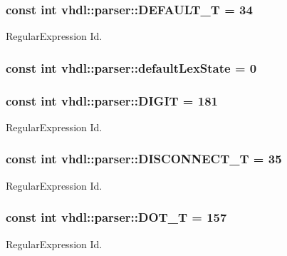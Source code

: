 \subsubsection[{D\+E\+F\+A\+U\+L\+T\+\_\+\+T}]{\setlength{\rightskip}{0pt plus 5cm}const int vhdl\+::parser\+::\+D\+E\+F\+A\+U\+L\+T\+\_\+\+T = 34}\label{namespacevhdl_1_1parser_aed0e3608c4ee544044df8eeca01d17a0}
Regular\+Expression Id. \hypertarget{namespacevhdl_1_1parser_a4b964d37fab29489e30c2b3788a43a43}{}
\subsubsection[{default\+Lex\+State}]{\setlength{\rightskip}{0pt plus 5cm}const int vhdl\+::parser\+::default\+Lex\+State = 0}\label{namespacevhdl_1_1parser_a4b964d37fab29489e30c2b3788a43a43}
\hypertarget{namespacevhdl_1_1parser_a4e41e17b71a26559b75918af4a670273}{}
\subsubsection[{D\+I\+G\+I\+T}]{\setlength{\rightskip}{0pt plus 5cm}const int vhdl\+::parser\+::\+D\+I\+G\+I\+T = 181}\label{namespacevhdl_1_1parser_a4e41e17b71a26559b75918af4a670273}
Regular\+Expression Id. \hypertarget{namespacevhdl_1_1parser_a5c3bde7d856749ad2ccc3565eb71aa41}{}
\subsubsection[{D\+I\+S\+C\+O\+N\+N\+E\+C\+T\+\_\+\+T}]{\setlength{\rightskip}{0pt plus 5cm}const int vhdl\+::parser\+::\+D\+I\+S\+C\+O\+N\+N\+E\+C\+T\+\_\+\+T = 35}\label{namespacevhdl_1_1parser_a5c3bde7d856749ad2ccc3565eb71aa41}
Regular\+Expression Id. \hypertarget{namespacevhdl_1_1parser_aaf6da501dfc4a5991dc8a801d38ebd71}{}
\subsubsection[{D\+O\+T\+\_\+\+T}]{\setlength{\rightskip}{0pt plus 5cm}const int vhdl\+::parser\+::\+D\+O\+T\+\_\+\+T = 157}\label{namespacevhdl_1_1parser_aaf6da501dfc4a5991dc8a801d38ebd71}
Regular\+Expression Id. \hypertarget{namespacevhdl_1_1parser_a7dce0594ff69d220df22f5d15c86cd60}{}
